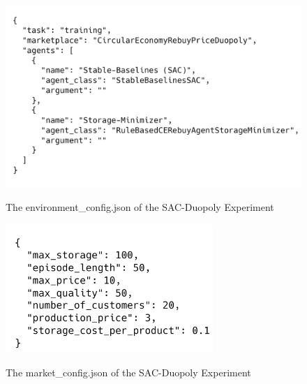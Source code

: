 \newpage

\begin{figure}[t]
	\includegraphics[width = \textwidth]{images/configs/SACDuopolyEnvironment.png}\\
	\caption{The environment\_config.json of the SAC-Duopoly Experiment}\label{fig:SACDuopolyConfigEnvironment}
\end{figure}

\begin{figure}
	\includegraphics[width = 0.7\textwidth]{images/configs/SACDuopolyMarket.png}\\
	\caption{The market\_config.json of the SAC-Duopoly Experiment}\label{fig:SACDuopolyConfigMarket}
\end{figure}